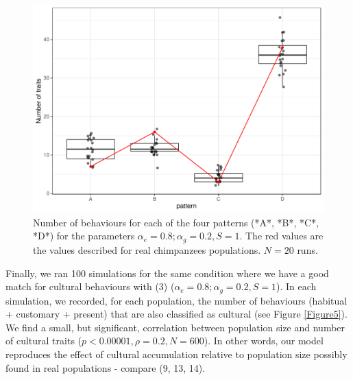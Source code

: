 \documentclass[9pt,twocolumn,twoside,]{pnas-new}
\begin{document}
\begin{figure}[h!]
\begin{center}
\includegraphics[width=11.4cm]{figures/figure_4.pdf}
\caption{Number of behaviours for each of the four patterns (*A*, *B*, *C*, *D*) for the parameters $\alpha_e=0.8;\alpha_g=0.2,S=1$. The red values are the values described for real chimpanzees populations. $N=20$ runs.}
\label{Figure4}
\end{center}
\end{figure}

Finally, we ran 100 simulations for the same condition where we have a
good match for cultural behaviours with (3)
(\(\alpha_e=0.8;\alpha_g=0.2, S=1\)). In each simulation, we recorded,
for each population, the number of behaviours (habitual + customary +
present) that are also classified as cultural (see Figure
\ref{Figure5}). We find a small, but significant, correlation between
population size and number of cultural traits
(\(p<0.00001,\rho=0.2,N=600\)). In other words, our model reproduces the
effect of cultural accumulation relative to population size possibly
found in real populations - compare (9, 13, 14).
\end{document}
